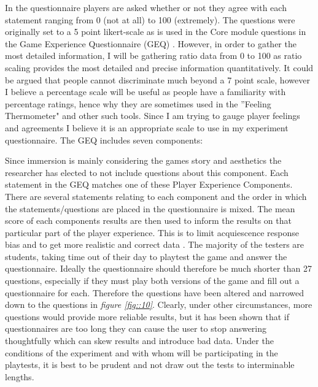\documentclass[journal]{IEEEtran}
\begin{document}
In the questionnaire players are asked whether or not they agree with each statement ranging from 0 (not at all) to 100 (extremely). The questions were originally set to a 5 point likert-scale as is used in the Core module questions in the Game Experience Questionnaire (GEQ) \cite{ijsselsteijn2013game}. However, in order to gather the most detailed information, I will be gathering ratio data from 0 to 100 as ratio scaling provides the most detailed and precise information quantitatively. It could be argued that people cannot discriminate much beyond a 7 point scale, however I believe a percentage scale will be useful as people have a familiarity with percentage ratings, hence why they are sometimes used in the ''Feeling Thermometer" and other such tools. Since I am trying to gauge player feelings and agreements I believe it is an appropriate scale to use in my experiment questionnaire. The GEQ includes seven components: 


Since immersion is mainly considering the games story and aesthetics the researcher has elected to not include questions about this component.
Each statement in the GEQ matches one of these Player Experience Components. There are several statements relating to each component and the order in which the statements/questions are placed in the questionnaire is mixed. The mean score of each components results are then used to inform the results on that particular part of the player experience. This is to limit acquiescence response bias and to get more realistic and correct data \cite{winkler1982controlling}. 
The majority of the testers are students, taking time out of their day to playtest the game and answer the questionnaire. Ideally the questionnaire should therefore be much shorter than 27 questions, especially if they must play both versions of the game and fill out a questionnaire for each. Therefore the questions have been altered and narrowed down to the questions in \textit{figure \ref{fig::10}}. Clearly, under other circumstances, more questions would provide more reliable results, but it has been shown that if questionnaires are too long they can cause the user to stop answering thoughtfully which can skew results and introduce bad data. Under the conditions of the experiment and with whom will be participating in the playtests, it is best to be prudent and not draw out the tests to interminable lengths.
\end{document}
